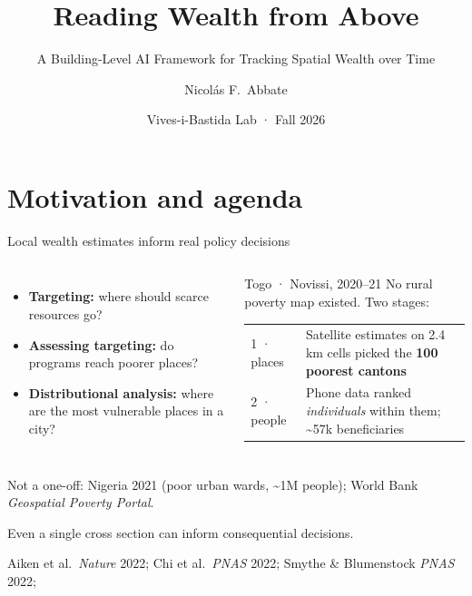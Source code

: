\documentclass[10pt,aspectratio=169]{beamer}
\title[Reading wealth from above]{Reading Wealth from Above}
\subtitle{A Building-Level AI Framework for Tracking Spatial Wealth over Time}
\author{Nicolás F.\ Abbate}
\institute{NYU}
\date{Vives-i-Bastida Lab · Fall 2026}
\begin{document}
\begin{frame}
  \titlepage
\end{frame}

\section{Motivation and agenda}

\begin{frame}{Local wealth estimates inform real policy decisions}
\begin{columns}[T]
\footnotesize
\begin{itemize}
  \item \textbf{Targeting:} where should scarce resources go?
  \item \textbf{Assessing targeting:} do programs reach poorer places?
  \item \textbf{Distributional analysis:} where are the most vulnerable places in a city?
\end{itemize}
\vspace{-1em}
\pause
\begin{tbox}[blue]{Togo · Novissi, 2020–21}
\footnotesize
No rural poverty map existed. Two stages:\par\smallskip
\begin{tabularx}{\linewidth}{@{}l>{\raggedright\arraybackslash}X@{}}
{\ttfamily\color{mgAccent}1 · places} & Satellite estimates on 2.4\,km cells picked the \textbf{100 poorest cantons}\\[3pt]
{\ttfamily\color{mgAccent}2 · people} & Phone data ranked \emph{individuals} within them; \textasciitilde 57k beneficiaries\\
\end{tabularx}
\end{tbox}
\vspace{0.2em}
\end{columns}
\pause
{\scriptsize\color{mgMuted}Not a one-off: Nigeria 2021 (poor urban wards, \textasciitilde 1M people); World Bank \emph{Geospatial Poverty Portal}.}
\begin{ibox}
Even a single cross section can inform consequential decisions.
\end{ibox}
{\hfill\tiny\color{mgMuted}Aiken et al.\ \emph{Nature} 2022; Chi et al.\ \emph{PNAS} 2022; Smythe \& Blumenstock \emph{PNAS} 2022;
}
\end{frame}
\end{document}
